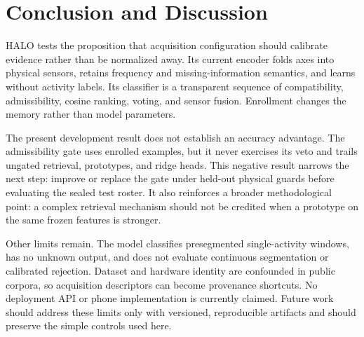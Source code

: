 \section{Conclusion and Discussion}
\label{sec:conclusion}

HALO tests the proposition that acquisition configuration should calibrate evidence rather than be
normalized away. Its current encoder folds axes into physical sensors, retains frequency and
missing-information semantics, and learns without activity labels. Its classifier is a transparent
sequence of compatibility, admissibility, cosine ranking, voting, and sensor fusion. Enrollment
changes the memory rather than model parameters.

The present development result does not establish an accuracy advantage. The admissibility gate
uses enrolled examples, but it never exercises its veto and trails ungated retrieval, prototypes,
and ridge heads. This negative result narrows the next step: improve or replace the gate under
held-out physical guards before evaluating the sealed test roster. It also reinforces a broader
methodological point: a complex retrieval mechanism should not be credited when a prototype on the
same frozen features is stronger.

Other limits remain. The model classifies presegmented single-activity windows, has no unknown
output, and does not evaluate continuous segmentation or calibrated rejection. Dataset and hardware
identity are confounded in public corpora, so acquisition descriptors can become provenance
shortcuts. No deployment API or phone implementation is currently claimed. Future work should
address these limits only with versioned, reproducible artifacts and should preserve the simple
controls used here.
